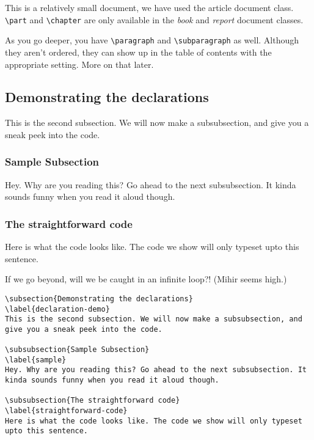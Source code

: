 \documentclass{article}
\begin{document}
This is a relatively small document, we have used the article document class. \verb!\part! and \verb!\chapter! are only available in the \emph{book} and \emph{report} document classes.

As you go deeper, you have \verb!\paragraph! and \verb!\subparagraph! as well. Although they aren't ordered, they can show up in the table of contents with the appropriate setting. More on that later.

\subsection{Demonstrating the declarations}
\label{declaration-demo}
This is the second subsection. We will now make a subsubsection, and give you a sneak peek into the code.

\subsubsection{Sample Subsection}
\label{sample}
Hey. Why are you reading this? Go ahead to the next subsubsection. It kinda sounds funny when you read it aloud though. 

\subsubsection{The straightforward code}
\label{straightforward-code}
Here is what the code looks like. The code we show will only typeset upto this sentence.

If we go beyond, will we be caught in an infinite loop?! (Mihir seems high.)

\begin{lstlisting}
\subsection{Demonstrating the declarations}
\label{declaration-demo}
This is the second subsection. We will now make a subsubsection, and give you a sneak peek into the code.

\subsubsection{Sample Subsection}
\label{sample}
Hey. Why are you reading this? Go ahead to the next subsubsection. It kinda sounds funny when you read it aloud though. 

\subsubsection{The straightforward code}
\label{straightforward-code}
Here is what the code looks like. The code we show will only typeset upto this sentence.
\end{lstlisting}
\end{document}
